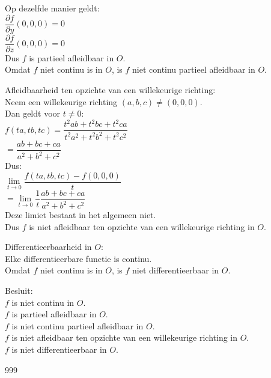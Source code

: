 \documentclass[a4paper]{article}
\newcommand{\llim}{\lim\limits}
\begin{document}
Op dezelfde manier geldt:\\

$\dfrac{\partial f}{\partial y}(0,0,0)=0$\\

$\dfrac{\partial f}{\partial z}(0,0,0)=0$\\

Dus $f$ is partieel afleidbaar in $O$.\\

Omdat $f$ niet continu is in $O$, is $f$ niet continu partieel afleidbaar in $O$.\\

\medskip

Afleidbaarheid ten opzichte van een willekeurige richting:\\

Neem een willekeurige richting $(a,b,c)\neq(0,0,0)$.\\

Dan geldt voor $t\neq0$:\\

$f(ta,tb,tc)
=
\dfrac{t^2ab+t^2bc+t^2ca}{t^2a^2+t^2b^2+t^2c^2}$\\

$=
\dfrac{ab+bc+ca}{a^2+b^2+c^2}$\\

Dus:\\

$\llim_{t\rightarrow0}
\dfrac{f(ta,tb,tc)-f(0,0,0)}{t}$\\

$=
\llim_{t\rightarrow0}
\dfrac{1}{t}
\dfrac{ab+bc+ca}{a^2+b^2+c^2}$\\

Deze limiet bestaat in het algemeen niet.\\

Dus $f$ is niet afleidbaar ten opzichte van een willekeurige richting in $O$.\\

\medskip

Differentieerbaarheid in $O$:\\

Elke differentieerbare functie is continu.\\

Omdat $f$ niet continu is in $O$, is $f$ niet differentieerbaar in $O$.\\

\medskip

Besluit:\\

$f$ is niet continu in $O$.\\

$f$ is partieel afleidbaar in $O$.\\

$f$ is niet continu partieel afleidbaar in $O$.\\

$f$ is niet afleidbaar ten opzichte van een willekeurige richting in $O$.\\

$f$ is niet differentieerbaar in $O$.\\

\begin{thebibliography}{999}
\end{thebibliography}
\end{document}
